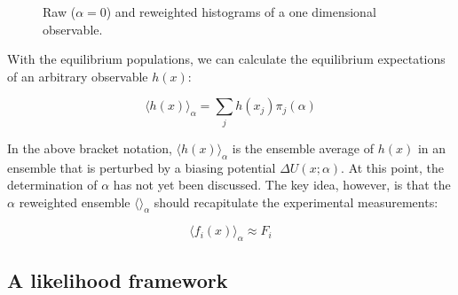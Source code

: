 \documentclass[journal=jacsat,manuscript=article]{achemso}
\begin{document}
\begin{figure}

\caption{
Raw ($\alpha = 0$) and reweighted histograms of a one dimensional observable.
}
\label{figure:Hist}
\end{figure}

With the equilibrium populations, we can calculate the equilibrium expectations of an arbitrary observable $h(x)$:

$$\langle h(x)\rangle _\alpha = \sum_j h(x_j) \pi_j(\alpha)$$

In the above bracket notation, $\langle h(x)\rangle _\alpha$ is the ensemble average of $h(x)$ in an ensemble that is perturbed by a biasing potential $\Delta U(x;\alpha)$.  At this point, the determination of $\alpha$ has not yet been discussed.  The key idea, however, is that the $\alpha$ reweighted ensemble $\langle \rangle _\alpha$ should recapitulate the experimental measurements:

$$\langle f_i(x)\rangle _\alpha \approx F_i$$


\subsection{A likelihood framework}
\end{document}
